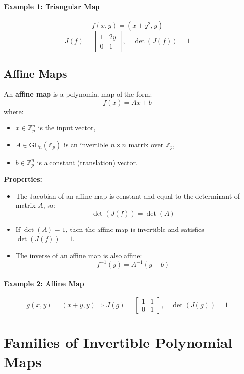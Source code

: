 \documentclass[12pt]{article}
\begin{document}
\paragraph{Example 1: Triangular Map}
\[
f(x, y) = (x + y^2, y)
\]
\[
J(f) = \begin{bmatrix} 1 & 2y \\ 0 & 1 \end{bmatrix}, \quad \det(J(f)) = 1
\]



\subsection*{Affine Maps}

An \textbf{affine map} is a polynomial map of the form:
\[
f(x) = A x + b
\]
where:
\begin{itemize}
    \item \( x \in \mathbb{Z}_p^n \) is the input vector,
    \item \( A \in \mathrm{GL}_n(\mathbb{Z}_p) \) is an invertible \( n \times n \) matrix over \( \mathbb{Z}_p \),
    \item \( b \in \mathbb{Z}_p^n \) is a constant (translation) vector.
\end{itemize}

\noindent
\textbf{Properties:}
\begin{itemize}
    \item The Jacobian of an affine map is constant and equal to the determinant of matrix \( A \), so:
    \[
    \det(J(f)) = \det(A)
    \]
    \item If \( \det(A) = 1 \), then the affine map is invertible and satisfies \( \det(J(f)) = 1 \).
    \item The inverse of an affine map is also affine:
    \[
    f^{-1}(y) = A^{-1}(y - b)
    \]
\end{itemize}


\paragraph{Example 2: Affine Map}
\[
g(x, y) = (x + y, y) \Rightarrow J(g) = \begin{bmatrix} 1 & 1 \\ 0 & 1 \end{bmatrix}, \quad \det(J(g)) = 1
\]

\section{Families of Invertible Polynomial Maps}
\end{document}
